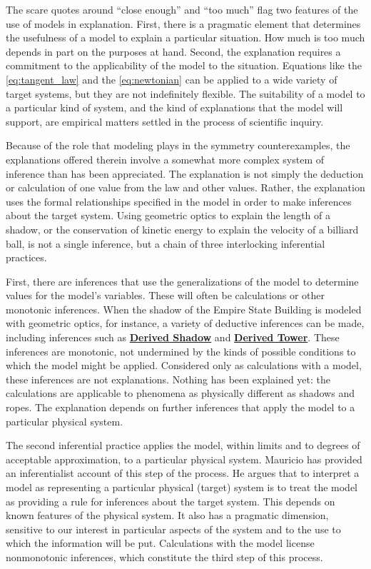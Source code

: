 \documentclass{article}                     %
\newcounter{fncntr}
\newcommand{\fnmark}[1]{\refstepcounter{fncntr}\label{#1}\footnotemark[\getrefnumber{#1}]}
\begin{document}
The scare quotes around ``close enough'' and ``too much'' flag two features of the use of models in explanation.  First, there is a pragmatic element that determines the usefulness of a model to explain a particular situation.  How much is too much depends in part on the purposes at hand.  Second, the explanation requires a commitment to the applicability of the model to the situation.  Equations like the \ref{eq:tangent_law} and the \ref{eq:newtonian} can be applied to a wide variety of target systems, but they are not indefinitely flexible.  The suitability of a model to a particular kind of system, and the kind of explanations that the model will support, are empirical matters settled in the process of scientific inquiry.

Because of the role that modeling plays in the symmetry counterexamples, the explanations offered therein involve a somewhat more complex system of inference than has been appreciated.  The explanation is not simply the deduction or calculation of one value from the law and other values.  Rather, the explanation uses the formal relationships specified in the model in order to make inferences about the target system.  Using geometric optics to explain the length of a shadow, or the conservation of kinetic energy to explain the velocity of a billiard ball, is not a single inference, but a chain of three interlocking inferential practices.

First, there are inferences that use the generalizations of the model to determine values for the model's variables.  These will often be calculations or other monotonic inferences. When the shadow of the Empire State Building is modeled with geometric optics, for instance, a variety of deductive inferences can be made, including inferences such as \hyperref[eq:shadow_expl]{\textbf{Derived Shadow}} and \hyperref[eq:height_expl]{\textbf{Derived Tower}}. These inferences are monotonic, not undermined by the kinds of possible conditions to which the model might be applied.  Considered only as calculations with a model, these inferences are not explanations.  Nothing has been explained yet: the calculations are applicable to phenomena as physically different as shadows and ropes.  The explanation depends on further inferences that apply the model to a particular physical system.

The second inferential practice applies the model, within limits and to degrees of acceptable approximation, to a particular physical system. Mauricio \cite{Suarez2003,Suarez2004} has provided an inferentialist account of this step of the process.  He argues that to interpret a model as representing a particular physical (target) system is to treat the model as providing a rule for inferences about the target system. This depends on known features of the physical system. It also has a pragmatic dimension, sensitive to our interest in particular aspects of the system and to the use to which the information will be put. Calculations with the model license nonmonotonic inferences, which constitute the third step of this process.
\end{document}
